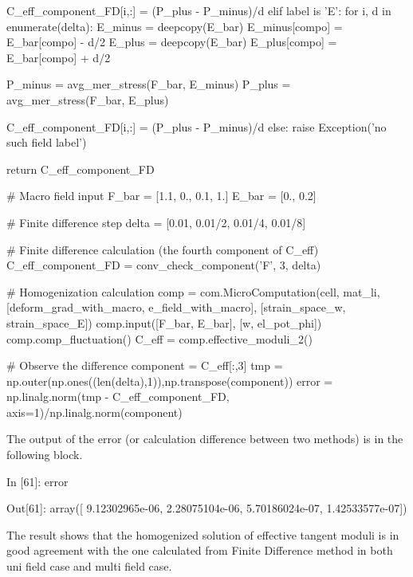 \documentclass[10pt,a4paper]{scrreprt}
\begin{document}
\begin{python}
            C_eff_component_FD[i,:] = (P_plus - P_minus)/d
    elif label is 'E':
        for i, d in enumerate(delta):
            E_minus = deepcopy(E_bar)
            E_minus[compo] = E_bar[compo] - d/2
            E_plus = deepcopy(E_bar)
            E_plus[compo] = E_bar[compo] + d/2

            P_minus = avg_mer_stress(F_bar, E_minus)
            P_plus  = avg_mer_stress(F_bar, E_plus)
            
            C_eff_component_FD[i,:] = (P_plus - P_minus)/d
    else:
        raise Exception('no such field label')
    
    return C_eff_component_FD 

# Macro field input
F_bar = [1.1, 0., 0.1, 1.]
E_bar = [0., 0.2]

# Finite difference step
delta = [0.01, 0.01/2, 0.01/4, 0.01/8]

# Finite difference calculation (the fourth component of C_eff)
C_eff_component_FD = conv_check_component('F', 3, delta)

# Homogenization calculation 
comp = com.MicroComputation(cell, mat_li,
                        [deform_grad_with_macro, e_field_with_macro],
                        [strain_space_w, strain_space_E])
comp.input([F_bar, E_bar], [w, el_pot_phi])
comp.comp_fluctuation()
C_eff = comp.effective_moduli_2()

# Observe the difference
component = C_eff[:,3]
tmp = np.outer(np.ones((len(delta),1)),np.transpose(component))
error = np.linalg.norm(tmp - C_eff_component_FD, axis=1)/np.linalg.norm(component)
\end{python}

The output of the error (or calculation difference between two methods) is in the following block.
\begin{python}
In [61]: error

Out[61]:
array([  9.12302965e-06,   2.28075104e-06,   5.70186024e-07,
         1.42533577e-07])
\end{python}

The result shows that the homogenized solution of effective tangent moduli is in good agreement with the one calculated from Finite Difference method in both uni field case and multi field case. 
\end{document}
